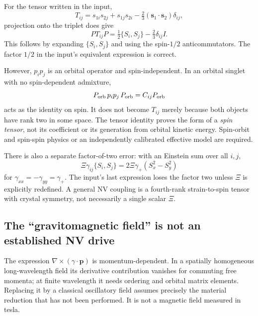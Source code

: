 \documentclass[a4paper,11pt]{article}
\newcommand{\ac}[2]{\{#1,#2\}}
\begin{document}
For the tensor written in the input,
\begin{equation}
 T_{ij}=s_{1i}s_{2j}+s_{1j}s_{2i}-\tfrac23(\bm s_1\cdot\bm s_2)\delta_{ij},
\end{equation}
projection onto the triplet does give
\begin{equation}
 PT_{ij}P=\tfrac12\ac{S_i}{S_j}-\tfrac23\delta_{ij}I.
\end{equation}
This follows by expanding $\ac{S_i}{S_j}$ and using the spin-$1/2$ anticommutators. The factor $1/2$ in the input's equivalent expression is correct.

However, $p_ip_j$ is an orbital operator and spin-independent. In an orbital singlet with no spin-dependent admixture,
\begin{equation}
 P_{\rm orb}\,p_ip_j\,P_{\rm orb}=C_{ij}P_{\rm orb}
\end{equation}
acts as the identity on spin. It does not become $T_{ij}$ merely because both objects have rank two in some space. The tensor identity proves the form of a \emph{spin tensor}, not its coefficient or its generation from orbital kinetic energy. Spin-orbit and spin-spin physics or an independently calibrated effective model are required.

There is also a separate factor-of-two error: with an Einstein sum over all $i,j$,
\begin{equation}
 \Xi\gamma_{ij}\ac{S_i}{S_j}
 =2\Xi\gamma_+(S_x^2-S_y^2)
\end{equation}
for $\gamma_{xx}=-\gamma_{yy}=\gamma_+$. The input's last expression loses the factor two unless $\Xi$ is explicitly redefined. A general NV coupling is a fourth-rank strain-to-spin tensor with crystal symmetry, not necessarily a single scalar $\Xi$.

\subsection{The ``gravitomagnetic field'' is not an established NV drive}

The expression $\nabla\times(\gamma\cdot\bm p)$ is momentum-dependent. In a spatially homogeneous long-wavelength field its derivative contribution vanishes for commuting free momenta; at finite wavelength it needs ordering and orbital matrix elements. Replacing it by a classical oscillatory field assumes precisely the material reduction that has not been performed. It is not a magnetic field measured in tesla.
\end{document}
